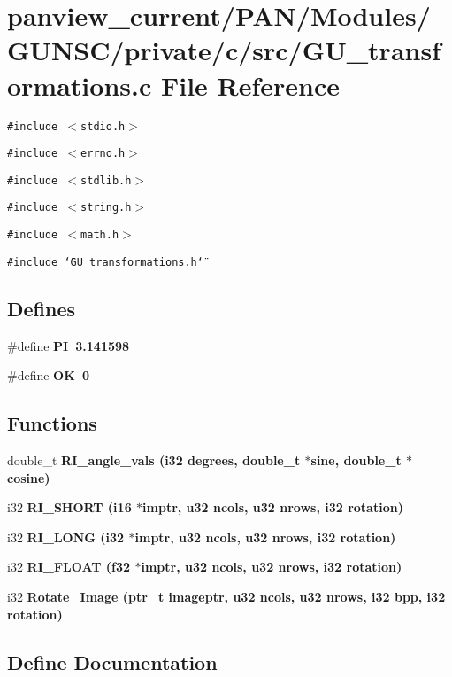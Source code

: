 \section{panview\_\-current/PAN/Modules/GUNSC/private/c/src/GU\_\-transformations.c File Reference}
\label{GU__transformations_8c}
{\tt \#include $<$stdio.h$>$}\par
{\tt \#include $<$errno.h$>$}\par
{\tt \#include $<$stdlib.h$>$}\par
{\tt \#include $<$string.h$>$}\par
{\tt \#include $<$math.h$>$}\par
{\tt \#include \char`\"{}GU\_\-transformations.h\char`\"{}}\par
\subsection*{Defines}
\begin{CompactItemize}
\item 
\#define \bf{PI}~3.141598
\item 
\#define \bf{OK}~0
\end{CompactItemize}
\subsection*{Functions}
\begin{CompactItemize}
\item 
double\_\-t \bf{RI\_\-angle\_\-vals} (i32 degrees, double\_\-t $\ast$sine, double\_\-t $\ast$cosine)
\item 
i32 \bf{RI\_\-SHORT} (i16 $\ast$imptr, u32 ncols, u32 nrows, i32 rotation)
\item 
i32 \bf{RI\_\-LONG} (i32 $\ast$imptr, u32 ncols, u32 nrows, i32 rotation)
\item 
i32 \bf{RI\_\-FLOAT} (f32 $\ast$imptr, u32 ncols, u32 nrows, i32 rotation)
\item 
i32 \bf{Rotate\_\-Image} (ptr\_\-t imageptr, u32 ncols, u32 nrows, i32 bpp, i32 rotation)
\end{CompactItemize}


\subsection{Define Documentation}
